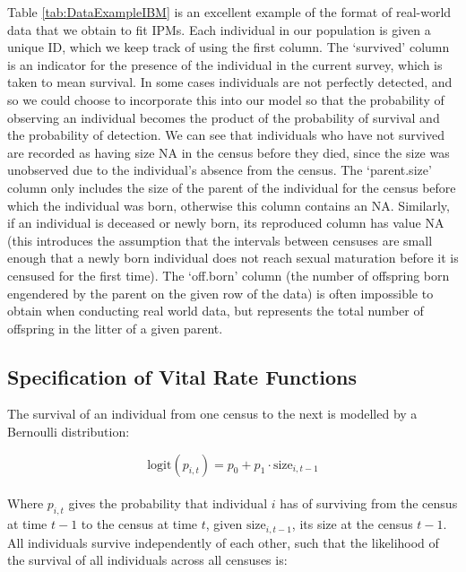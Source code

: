 \documentclass[a4paper,12pt]{article}
\begin{document}
\vspace{0.5cm} %

Table \ref{tab:DataExampleIBM} is an excellent example of the format of real-world data that we obtain to fit IPMs. Each individual in our population is given a unique ID, which we keep track of using the first column. The `survived' column is an indicator for the presence of the individual in the current survey, which is taken to mean survival. In some cases individuals are not perfectly detected, and so we could choose to incorporate this into our model so that the probability of observing an individual becomes the product of the probability of survival and the probability of detection. We can see that individuals who have not survived are recorded as having size NA in the census before they died, since the size was unobserved due to the individual's absence from the census. The `parent.size' column only includes the size of the parent of the individual for the census before which the individual was born, otherwise this column contains an NA. Similarly, if an individual is deceased or newly born, its reproduced column has value NA (this introduces the assumption that the intervals between censuses are small enough that a newly born individual does not reach sexual maturation before it is censused for the first time). The `off.born' column (the number of offspring born engendered by the parent on the given row of the data) is often impossible to obtain when conducting real world data, but represents the total number of offspring in the litter of a given parent.

\subsection{Specification of Vital Rate Functions}
The survival of an individual from one census to the next is modelled by a Bernoulli distribution:

\begin{equation}
    \text{logit}(p_{i,t}) = p_0 + p_1 \cdot \text{size}_{i, t-1}
\end{equation}\\

Where $p_{i,t}$ gives the probability that individual $i$ has of surviving from the census at time $t-1$ to the census at time $t$, given $\text{size}_{i, t-1}$, its size at the census $t-1$. All individuals survive independently of each other, such that the likelihood of the survival of all individuals across all censuses is:
\end{document}

